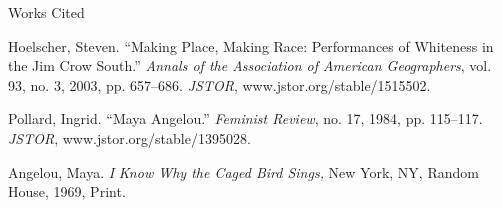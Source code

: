 \documentclass[letterpaper,portrait,12pt]{article}
\begin{document}
\begin{center}
Works Cited
\end{center}


\begin{spacing}{1.67}
Hoelscher, Steven. {``}Making Place, Making Race: Performances of Whiteness in the Jim Crow South.'' \emph{Annals of the Association of American Geographers}, vol. 93, no. 3, 2003,
	pp. 657--686. \emph{JSTOR}, www.jstor.org/stable/1515502.
\end{spacing}


\begin{spacing}{1.67}
Pollard, Ingrid. {``}Maya Angelou.'' \emph{Feminist Review}, no. 17, 1984, pp. 115--117. \emph{JSTOR}, 
	www.jstor.org/stable/1395028.
\end{spacing}


\begin{spacing}{1.67}
Angelou, Maya. \emph{I }\emph{K}\emph{now Why the C}\emph{aged Bird Sings, }New York, NY, Random House, 1969, Print.
\end{spacing}
\end{document}
